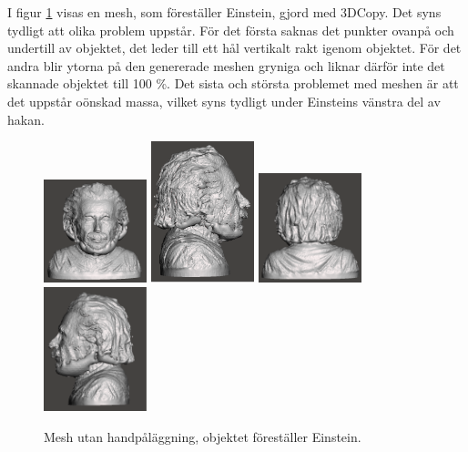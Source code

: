 I figur \ref{fig:einstein_mesh_without_imposition} visas en mesh, som föreställer Einstein, gjord med 3DCopy. Det syns tydligt att olika problem uppstår. För det första saknas det punkter ovanpå och undertill av objektet, det leder till ett hål vertikalt rakt igenom objektet. För det andra blir ytorna på den genererade meshen gryniga och liknar därför inte det skannade objektet till 100 \%. Det sista och största problemet med meshen är att det uppstår oönskad massa, vilket syns tydligt under Einsteins vänstra del av hakan.

\begin{figure}[H]
	\centering
	\includegraphics[width=30mm]{figures/ein_mesh_without_imposition1.png}
	\includegraphics[width=30mm]{figures/ein_mesh_without_imposition2.png}
	\includegraphics[width=30mm]{figures/ein_mesh_without_imposition3.png}
	\includegraphics[width=30mm]{figures/ein_mesh_without_imposition4.png}
	\caption{Mesh utan handpåläggning, objektet föreställer Einstein.}
	\label{fig:einstein_mesh_without_imposition}
\end{figure}

